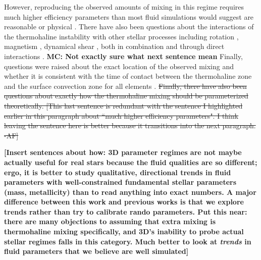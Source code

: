 However, reproducing the observed amounts of mixing in this regime requires much higher efficiency parameters than most fluid simulations would suggest are reasonable or physical %
\citep{Denissenkov2010thermohaline, denissenkov_merryfield_2011, traxler_etal_2011, brown_etal_2013}. There have also been questions about the interactions of the thermohaline instability with other stellar processes
including rotation \citep{Lagarde2011}, magnetism \citep{harrington}, 
dynamical shear \citep{CantielloLanger2010}, both in combination and through direct interactions \citep{Maeder2013, SenguptaGaraud2018,harrington}. 
\textbf{MC: Not exactly sure what next sentence mean}
Finally, questions were raised about the exact location of the observed mixing and whether it is consistent with the time of contact between the thermohaline zone and the surface convection zone for all elements \citep[see e.g.][]{Angelou2015, Henkel2017, TayarJoyce22}.
\sout{Finally, there have also been questions about exactly how the thermohaline mixing should be parameterized theoretically. 
[This last sentence is redundant with the sentence I highlighted earlier in this paragraph about ``much higher efficiency parameters". I think leaving the sentence here is better because it transitions into the next paragraph. -AF]}

%

\textbf{[Insert sentences about how:
3D parameter regimes are not maybe actually useful for real stars because the fluid qualities are so different; ergo, it is better to study qualitative, directional trends in fluid parameters with well-constrained fundamental stellar parameters (mass, metallicity) than to read anything into exact numbers. A major difference between this work and previous works is that we explore trends rather than try to calibrate rando parameters. Put this near: there are many objections to assuming that extra mixing is thermohaline mixing specifically, and 3D's inability to probe actual stellar regimes falls in this category. Much better to look at \textit{trends} in fluid parameters that we believe are well simulated]}

